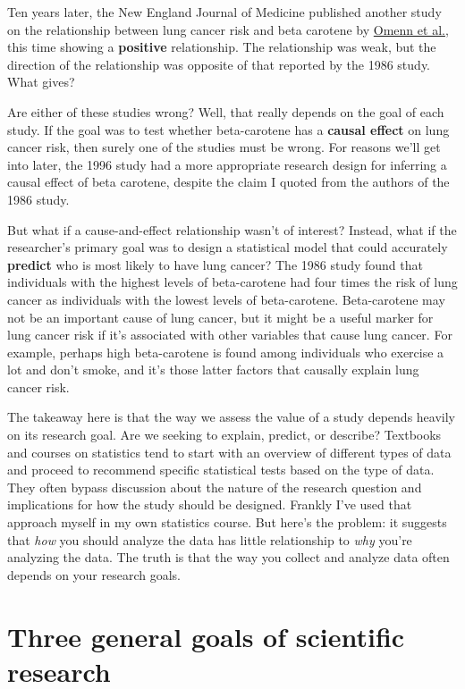 \documentclass[
]{book}
\begin{document}
Ten years later, the New England Journal of Medicine published another study on the relationship between lung cancer risk and beta carotene by \href{https://www.nejm.org/doi/full/10.1056/NEJM199605023341802}{Omenn et al.}, this time showing a \textbf{positive} relationship. The relationship was weak, but the direction of the relationship was opposite of that reported by the 1986 study. What gives?

Are either of these studies wrong? Well, that really depends on the goal of each study. If the goal was to test whether beta-carotene has a \textbf{causal effect} on lung cancer risk, then surely one of the studies must be wrong. For reasons we'll get into later, the 1996 study had a more appropriate research design for inferring a causal effect of beta carotene, despite the claim I quoted from the authors of the 1986 study.

But what if a cause-and-effect relationship wasn't of interest? Instead, what if the researcher's primary goal was to design a statistical model that could accurately \textbf{predict} who is most likely to have lung cancer? The 1986 study found that individuals with the highest levels of beta-carotene had four times the risk of lung cancer as individuals with the lowest levels of beta-carotene. Beta-carotene may not be an important cause of lung cancer, but it might be a useful marker for lung cancer risk if it's associated with other variables that cause lung cancer. For example, perhaps high beta-carotene is found among individuals who exercise a lot and don't smoke, and it's those latter factors that causally explain lung cancer risk.

The takeaway here is that the way we assess the value of a study depends heavily on its research goal. Are we seeking to explain, predict, or describe? Textbooks and courses on statistics tend to start with an overview of different types of data and proceed to recommend specific statistical tests based on the type of data. They often bypass discussion about the nature of the research question and implications for how the study should be designed. Frankly I've used that approach myself in my own statistics course. But here's the problem: it suggests that \emph{how} you should analyze the data has little relationship to \emph{why} you're analyzing the data. The truth is that the way you collect and analyze data often depends on your research goals.

\section{Three general goals of scientific research}\label{three-general-goals-of-scientific-research}
\end{document}
